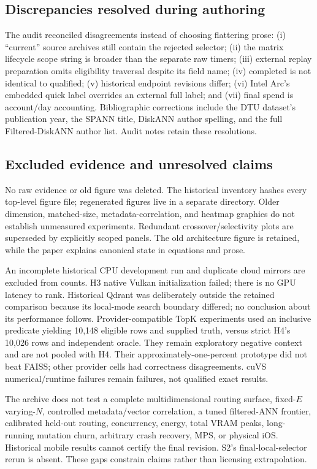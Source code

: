 \subsection{Discrepancies resolved during authoring}
The audit reconciled disagreements instead of choosing flattering prose: (i) ``current'' source archives still contain the rejected selector; (ii) the matrix lifecycle scope string is broader than the separate raw timers; (iii) external replay preparation omits eligibility traversal despite its field name; (iv) completed is not identical to qualified; (v) historical endpoint revisions differ; (vi) Intel Arc's embedded quick label overrides an external full label; and (vii) final spend is account/day accounting. Bibliographic corrections include the DTU dataset's publication year, the SPANN title, DiskANN author spelling, and the full Filtered-DiskANN author list. Audit notes retain these resolutions.

\subsection{Excluded evidence and unresolved claims}
No raw evidence or old figure was deleted. The historical inventory hashes every top-level figure file; regenerated figures live in a separate  directory. Older dimension, matched-size, metadata-correlation, and heatmap graphics do not establish unmeasured experiments. Redundant crossover/selectivity plots are superseded by explicitly scoped panels. The old architecture figure is retained, while the paper explains canonical state in equations and prose.

An incomplete historical CPU development run and duplicate cloud mirrors are excluded from counts. H3 native Vulkan initialization failed; there is no GPU latency to rank. Historical Qdrant was deliberately outside the retained comparison because its local-mode search boundary differed; no conclusion about its performance follows. Provider-compatible TopK experiments used an inclusive predicate yielding 10,148 eligible rows and supplied truth, versus strict H4's 10,026 rows and independent oracle. They remain exploratory negative context and are not pooled with H4. Their approximately-one-percent prototype did not beat FAISS; other provider cells had correctness disagreements. cuVS numerical/runtime failures remain failures, not qualified exact results.

The archive does not test a complete multidimensional routing surface, fixed-$E$ varying-$N$, controlled metadata/vector correlation, a tuned filtered-ANN frontier, calibrated held-out routing, concurrency, energy, total VRAM peaks, long-running mutation churn, arbitrary crash recovery, MPS, or physical iOS. Historical mobile results cannot certify the final revision. S2's final-local-selector rerun is absent. These gaps constrain claims rather than licensing extrapolation.

